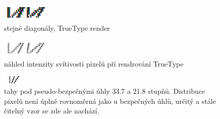 \documentclass[a4paper]{article}
\begin{document}
\begin{enumerate}
\begin{figure}[H]
  \includegraphics[width=\linewidth]{pics/truetype.png}
  \caption{stejné diagonály, TrueType render}
\end{figure}

\begin{figure}[H]
  \includegraphics[width=\linewidth]{pics/truetype_bw.png}
  \caption{náhled intenzity svítivosti pixelů pří rendrování TrueType}
\end{figure}

\begin{figure}[H]
  \includegraphics[width=\linewidth]{pics/pseudo.png}
  \caption{tahy pod pseudo-bezpečnými úhly 33.7 a 21.8 stupňů. Distribuce pixelů není úplně rovnoměrná jako u bezpečných úhlů, určitý a stále čitelný vzor se zde ale nachází.}
\end{figure}



\end{enumerate}
\end{document}

